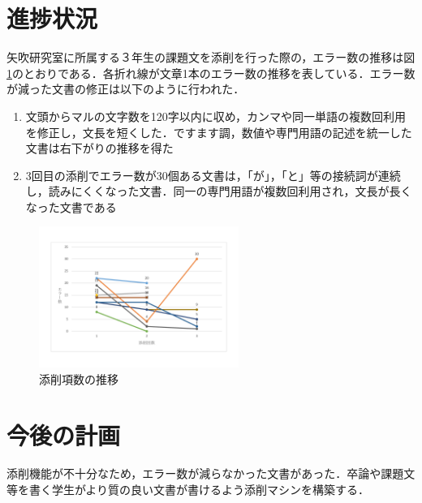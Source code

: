 \documentclass[uplatex,twocolumn,dvipdfmx]{jsarticle}
\begin{document}
\section{進捗状況}
矢吹研究室に所属する３年生の課題文を添削を行った際の，エラー数の推移は図\ref{conf}のとおりである．各折れ線が文章1本のエラー数の推移を表している．エラー数が減った文書の修正は以下のように行われた．

\begin{enumerate}
 \item 文頭からマルの文字数を120字以内に収め，カンマや同一単語の複数回利用を修正し，文長を短くした．ですます調，数値や専門用語の記述を統一した文書は右下がりの推移を得た
 \item 3回目の添削でエラー数が30個ある文書は，「が」，「と」等の接続詞が連続し，読みにくくなった文書．同一の専門用語が複数回利用され，文長が長くなった文書である
\end{enumerate}

\begin{figure}[h]
\centering
\includegraphics[width=6.5cm,clip]{redpen.pdf}
\caption{添削項数の推移}\label{conf}
\end{figure}

\section{今後の計画}
添削機能が不十分なため，エラー数が減らなかった文書があった．卒論や課題文等を書く学生がより質の良い文書が書けるよう添削マシンを構築する．


\end{document}
